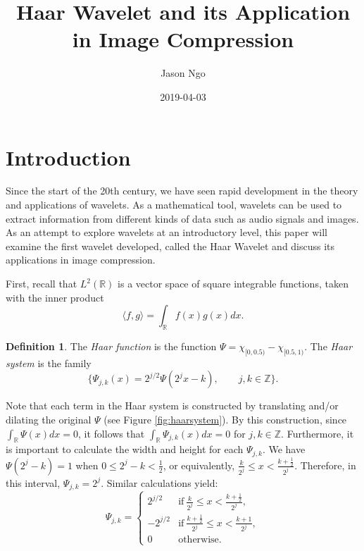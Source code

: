 \documentclass[11pt]{amsart}
\title{Haar Wavelet and its Application in Image Compression}
\author{Jason Ngo}
\date{2019-04-03}
\theoremstyle{theorem} %
\theoremstyle{definition}
\newtheorem{defn}[thm]{Definition}
\theoremstyle{example}
\theoremstyle{remark}
\numberwithin{equation}{section}
\newcommand{\R}{\mathbb{R}}
\newcommand{\Z}{\mathbb{Z}}
\begin{document}
\maketitle

\section{Introduction}
Since the start of the 20th century, we have seen rapid development in the theory and applications of wavelets. As a mathematical tool, wavelets can be used to extract information from different kinds of data such as audio signals and images. As an attempt to explore wavelets at an introductory level, this paper will examine the first wavelet developed, called the Haar Wavelet and discuss its applications in image compression.

\vspace{8pt}
First, recall that \emph{$ L^2(\R) $} is a vector space of square integrable functions, taken with the inner product
\[ \langle f,g \rangle = \int_{\R} f(x) g(x)  dx. \]

\begin{defn} \label{haar}
	The \emph{Haar function} is the function $ \varPsi = \chi_{[0,0.5)} - \chi_{[0.5,1)} $. The \emph{Haar system} is the family
	\[ \{ \varPsi_{j,k}(x) = 2^{j/2} \varPsi (2^j x-k), \qquad j,k \in \Z \}. \]
\end{defn}

	Note that each term in the Haar system is constructed by translating and/or dilating the original $ \varPsi $ (see Figure \ref{fig:haarsystem}). By this construction, since $ \int_{\R} \varPsi(x)dx = 0 $, it follows that $ \int_{\R} \varPsi_{j,k}(x)dx = 0 $ for $ j,k \in \Z $.
	Furthermore, it is important to calculate the width and height for each $ \varPsi_{j,k} $. We have $ \varPsi(2^j - k) = 1 $ when $ 0 \leq 2^j - k < \frac{1}{2} $, or equivalently, $ \frac{k}{2^j} \leq x < \frac{k+\frac{1}{2}}{2^j} $. Therefore, in this interval, $ \varPsi_{j,k} = 2^j $. Similar calculations yield:
	\begin{equation} \label{eq:height}
		\varPsi_{j,k} = 
		\begin{cases}
		2^{j/2} &\text{if}\ \frac{k}{2^j} \leq x < \frac{k+\frac{1}{2}}{2^j}, \\
		-2^{j/2} &\text{if}\ \frac{k+\frac{1}{2}}{2^j} \leq x < \frac{k+1}{2^j}, \\
		0 &\text{otherwise}.
		\end{cases}
	\end{equation}
\end{document}
